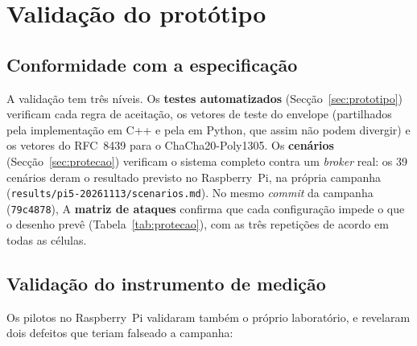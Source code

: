 \section{Validação do protótipo}
\label{sec:validacao}

\subsection{Conformidade com a especificação}

A validação tem três níveis. Os \textbf{testes automatizados}
(Secção~\ref{sec:prototipo}) verificam cada regra de aceitação, os vetores de
teste do envelope (partilhados pela implementação em C++ e pela em Python, que
assim não podem divergir) e os vetores do RFC~8439 para o ChaCha20-Poly1305. Os
\textbf{cenários} (Secção~\ref{sec:protecao}) verificam o sistema completo contra
um \emph{broker} real: os 39 cenários deram o resultado previsto no
Raspberry~Pi, na própria campanha (\texttt{results/pi5-20261113/scenarios.md}). No
mesmo \emph{commit} da campanha (\texttt{79c4878}), 
A \textbf{matriz de ataques} confirma que cada configuração impede o que o desenho
prevê (Tabela~\ref{tab:protecao}), com as três repetições de acordo em todas as
células.

\subsection{Validação do instrumento de medição}

Os pilotos no Raspberry~Pi validaram também o próprio laboratório, e revelaram
dois defeitos que teriam falseado a campanha:

